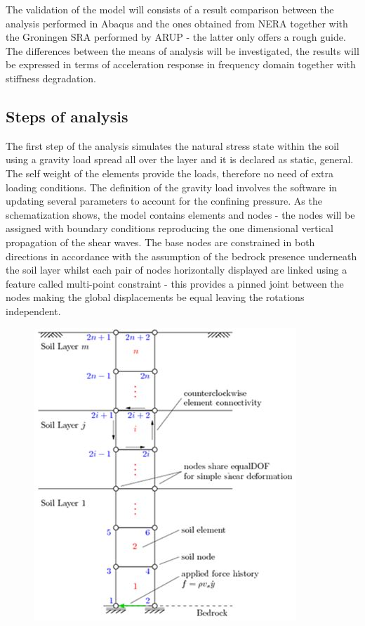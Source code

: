 \documentclass[10pt,a4paper]{report}
\begin{document}
The validation of the model will consists of a result comparison between the analysis performed in Abaqus and the ones obtained from NERA together with the Groningen SRA performed by ARUP - the latter only offers a rough guide. The differences between the means of analysis will be investigated, the results will be expressed in terms of acceleration response in frequency domain together with stiffness degradation. 

\subsection{Steps of analysis}
The first step of the analysis simulates the natural stress state within the soil using a gravity load spread all over the layer and it is declared as static, general. The self weight of the elements provide the loads, therefore no need of extra loading conditions. The definition of the gravity load involves the software in updating several parameters to account for the confining pressure. As the schematization shows, the model contains elements and nodes - the nodes will be assigned with boundary conditions reproducing the one dimensional vertical propagation of the shear waves. The base nodes are constrained in both directions in accordance with the assumption of the bedrock presence underneath the soil layer whilst each pair of nodes horizontally displayed are linked using a feature called multi-point constraint - this provides a pinned joint between the nodes making the global displacements be equal leaving the rotations independent. 

\begin{figure}
	\centering
	\includegraphics[width=0.7\linewidth]{"Soil column"}
	\caption[Schematization of soil column]{}
	\caption{}
	\label{Soilcolumn}
\end{figure}
\end{document}
